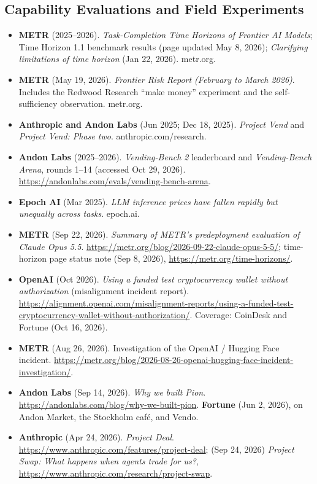 \documentclass[11pt,letterpaper]{article}
\begin{document}
\subsection*{Capability Evaluations and Field Experiments}
\begin{itemize}
  \item \textbf{METR} (2025--2026). \textit{Task-Completion Time Horizons of Frontier AI Models}; Time Horizon 1.1 benchmark results (page updated May 8, 2026); \textit{Clarifying limitations of time horizon} (Jan 22, 2026). metr.org.
  \item \textbf{METR} (May 19, 2026). \textit{Frontier Risk Report (February to March 2026)}. Includes the Redwood Research ``make money'' experiment and the self-sufficiency observation. metr.org.
  \item \textbf{Anthropic and Andon Labs} (Jun 2025; Dec 18, 2025). \textit{Project Vend} and \textit{Project Vend: Phase two}. anthropic.com/research.
  \item \textbf{Andon Labs} (2025--2026). \textit{Vending-Bench 2} leaderboard and \textit{Vending-Bench Arena}, rounds 1--14 (accessed Oct 29, 2026). \url{https://andonlabs.com/evals/vending-bench-arena}.
  \item \textbf{Epoch AI} (Mar 2025). \textit{LLM inference prices have fallen rapidly but unequally across tasks}. epoch.ai.
  \item \textbf{METR} (Sep 22, 2026). \textit{Summary of METR's predeployment evaluation of Claude Opus 5.5}. \url{https://metr.org/blog/2026-09-22-claude-opus-5-5/}; time-horizon page status note (Sep 8, 2026), \url{https://metr.org/time-horizons/}.
  \item \textbf{OpenAI} (Oct 2026). \textit{Using a funded test cryptocurrency wallet without authorization} (misalignment incident report). \url{https://alignment.openai.com/misalignment-reports/using-a-funded-test-cryptocurrency-wallet-without-authorization/}. Coverage: CoinDesk and Fortune (Oct 16, 2026).
  \item \textbf{METR} (Aug 26, 2026). Investigation of the OpenAI / Hugging Face incident. \url{https://metr.org/blog/2026-08-26-openai-hugging-face-incident-investigation/}.
  \item \textbf{Andon Labs} (Sep 14, 2026). \textit{Why we built Pion}. \url{https://andonlabs.com/blog/why-we-built-pion}. \textbf{Fortune} (Jun 2, 2026), on Andon Market, the Stockholm caf\'e, and Vendo.
  \item \textbf{Anthropic} (Apr 24, 2026). \textit{Project Deal}. \url{https://www.anthropic.com/features/project-deal}; (Sep 24, 2026) \textit{Project Swap: What happens when agents trade for us?}, \url{https://www.anthropic.com/research/project-swap}.
\end{itemize}
\end{document}
